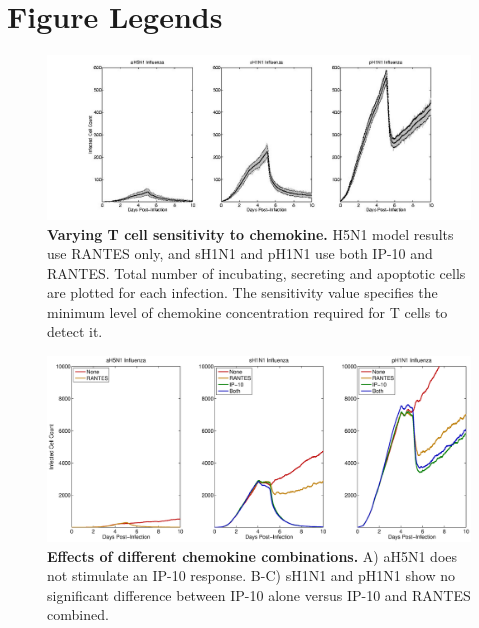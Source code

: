 \documentclass[10pt]{article}
\begin{document}


\pagebreak

\section*{Figure Legends}



\setcounter{figure}{0}
\renewcommand{\thefigure}{S\arabic{figure}}


\begin{figure}[!ht]
\begin{center}
 \includegraphics[width=\textwidth]{Figure_S1}
 \end{center}
\caption{{\bf Varying T cell sensitivity to chemokine.}  H5N1 model results use RANTES  only, and sH1N1 and pH1N1 use both IP-10 and RANTES. Total number of incubating, secreting and apoptotic cells are plotted for each infection.  The sensitivity value specifies the minimum level of chemokine concentration required for T cells to detect it. } 
 \label{fig:sensitivity}
\end{figure}


\begin{figure}[ht!]
\begin{center}
	\includegraphics[width=\textwidth]{Figure_S2}
	\caption{\textbf{Effects of different chemokine combinations.}  A) aH5N1 does not stimulate an IP-10 response.  B-C) sH1N1 and pH1N1 show no significant difference between IP-10 alone versus IP-10 and RANTES combined.}
	\label{fig:chemokine}
\end{center}
\end{figure}
\end{document}

